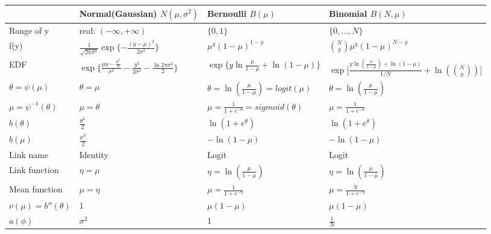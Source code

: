 \documentclass[letterpaper,10pt,english]{sphinxmanual}
\begin{document}
\begin{savenotes}\sphinxattablestart
\centering
{}
\sphinxthecaptionisattop
{}\label{\detokenize{_u5e7f_u4e49_u7ebf_u6027_u6a21_u578b/content:id13}}
\sphinxaftertopcaption
\begin{tabulary}{\linewidth}[t]{|T|T|T|T|}
\hline
\sphinxstyletheadfamily &\sphinxstyletheadfamily 
Normal(Gaussian) \(N(\mu,\sigma^2)\)
&\sphinxstyletheadfamily 
Bernoulli \(B(\mu)\)
&\sphinxstyletheadfamily 
Binomial \(B(N,\mu)\)
\\
\hline
Range of y
&
real: \((-\infty,+\infty)\)
&
\(\{0,1\}\)
&
\(\{0,\dots,N\}\)
\\
\hline
f(y)
&
\(\frac{1}{\sqrt{2\pi\sigma^2}}\exp \{ -\frac{(y-\mu)^2}{2\sigma^2} \}\)
&
\(\mu^y(1-\mu)^{1-y}\)
&
\(\binom{N}{y}\mu^y(1-\mu)^{N-y}\)
\\
\hline
EDF
&
\(\exp\{\frac{\mu y-\frac{\mu^2}{2}}{\sigma^2}-\frac{y^2}{2\sigma^2}-\frac{\ln 2\pi\sigma^2}{2}\}\)
&
\(\exp\{y \ln \frac{\mu}{1-\mu} + \ln(1-\mu)\}\)
&
\(\exp\bigg[ \frac{y \ln(\frac{\mu}{1-\mu}) + \ln(1-\mu)}{1/N} + \ln({N \choose y})\bigg]\)
\\
\hline
\(\theta=\psi(\mu)\)
&
\(\theta=\mu\)
&
\(\theta=\ln \left ( \frac{\mu}{1-\mu} \right )=logit(\mu)\)
&
\(\theta=\ln \left ( \frac{\mu}{1-\mu} \right )\)
\\
\hline
\(\mu=\psi^{-1}(\theta)\)
&
\(\mu=\theta\)
&
\(\mu=\frac{1}{1+e^{-\theta}}=sigmoid(\theta)\)
&
\(\mu=\frac{1}{1+e^{-\theta}}\)
\\
\hline
\(b(\theta)\)
&
\(\frac{\theta^2}{2}\)
&
\(\ln(1+e^{\theta})\)
&
\(\ln(1+e^{\theta})\)
\\
\hline
\(b(\mu)\)
&
\(\frac{\mu^2}{2}\)
&
\(-\ln(1-\mu)\)
&
\(-\ln(1-\mu)\)
\\
\hline
Link name
&
Identity
&
Logit
&
Logit
\\
\hline
Link function
&
\(\eta=\mu\)
&
\(\eta=\ln \left( \frac{\mu}{1-\mu} \right)\)
&
\(\eta=\ln \left( \frac{\mu}{1-\mu} \right)\)
\\
\hline
Mean function
&
\(\mu=\eta\)
&
\(\mu=\frac{1}{1+e^{-\eta}}\)
&
\(\mu=\frac{N}{1+e^{-\eta}}\)
\\
\hline
\(\nu(\mu)=b''(\theta)\)
&
1
&
\(\mu(1-\mu)\)
&
\(\mu(1-\mu)\)
\\
\hline
\(a(\phi)\)
&
\(\sigma^2\)
&
1
&
\(\frac{1}{N}\)
\\
\hline
\end{tabulary}
\par
\sphinxattableend\end{savenotes}
\end{document}

